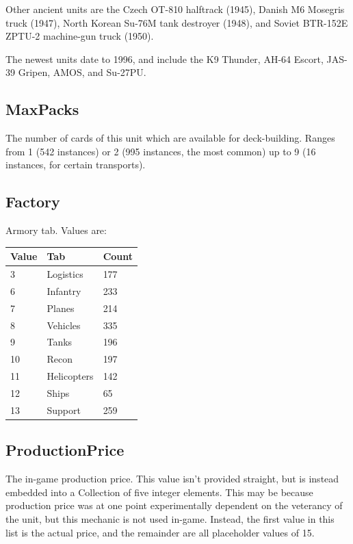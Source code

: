 \documentclass{article}
\begin{document}
Other ancient units are the Czech OT-810 halftrack (1945), Danish M6 Mosegris truck (1947), North Korean Su-76M tank destroyer (1948), and Soviet BTR-152E ZPTU-2 machine-gun truck (1950).

The newest units date to 1996, and include the K9 Thunder, AH-64 Escort, JAS-39 Gripen, AMOS, and Su-27PU.

\subsection{MaxPacks}

The number of cards of this unit which are available for deck-building. Ranges from 1 (542 instances) or 2 (995 instances, the most common) up to 9 (16 instances, for certain transports).

\subsection{Factory}

Armory tab. Values are:

\begin{center}
    \begin{tabular}{ | l | l | l |}
    \hline
	Value & Tab & Count\\ \hline
	3 & Logistics & 177\\
	6 & Infantry & 233\\
	7 & Planes & 214\\
	8 & Vehicles & 335\\
	9 & Tanks & 196\\
	10 & Recon & 197\\
	11 & Helicopters & 142\\
	12 & Ships & 65\\
	13 & Support & 259\\
    \hline
    \end{tabular}
\end{center}

\subsection{ProductionPrice}

The in-game production price. This value isn't provided straight, but is instead embedded into a Collection of five integer elements. This may be because production price was at one point experimentally dependent on the veterancy of the unit, but this mechanic is not used in-game. Instead, the first value in this list is the actual price, and the remainder are all placeholder values of 15.
\end{document}
